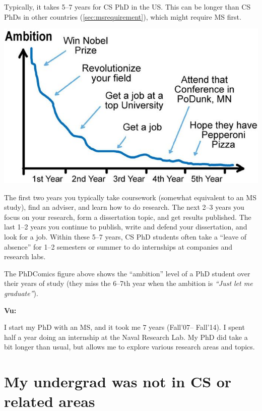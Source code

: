 \documentclass[oneside,11pt,dvipsnames]{book}
\newenvironment{commentbox}[1][]{
  \small
  \begin{mybox}
    {\small \textbf{#1}}
  }{
  \end{mybox}
}
\def\sectioninfo#1{%
  \addcontentsline{toc}{sectioninfo}{%
    \noexpand\numberline{}\color{black}{#1}}%
}
\begin{document}
Typically, it takes 5--7 years for CS PhD in the US.  This can be longer than CS PhDs in other countries (\autoref{sec:msrequirement}), which might require MS first. 


\begin{center}
  \includegraphics[scale=0.5]{files/c4a.png}
\end{center}

The first two years you typically take coursework (somewhat equivalent to an MS study), find an adviser, and learn how to do research.  The next 2--3 years you focus on your research, form a dissertation topic, and get results published. The last 1--2 years you continue to publish, write and defend your dissertation, and look for a job.
Within these 5--7 years, CS PhD students often take a ``leave of absence'' for 1--2 semesters or summer to do internships at companies and research labs.

The PhDComics figure above shows the ``ambition'' level of a PhD student over their years of study (they miss the 6--7th year when the ambition is \emph{``Just let me graduate''}).

\begin{commentbox}[Vu:]
    I start my PhD with an MS, and it took me 7 years (Fall'07-- Fall'14). I spent half a year doing an internship at the Naval Research Lab. My PhD did take a bit longer than usual, but allows me to explore various research areas and topics.
  \end{commentbox}

\section{My undergrad was not in CS or related areas}\label{sec:non-stem}
\sectioninfo{You can successfully apply to CS PhD even if you have non-CS background.}
\end{document}
